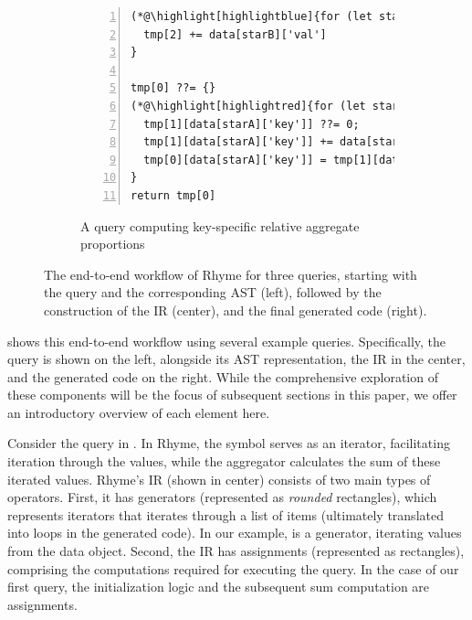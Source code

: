 \documentclass[runningheads]{llncs}
\newcommand{\lang}{Rhyme}
\begin{document}
\begin{figure}[t!]
\begin{subfigure}{\textwidth}
\begin{minipage}{0.38\textwidth}
\begin{lstlisting}[style=JavaScriptTiny, columns=flexible, numbers=left, xleftmargin=2pt]
(*@\highlight[highlightblue]{for (let starB in data)}@*) {  // loop hoisted!
  tmp[2] += data[starB]['val']
}

tmp[0] ??= {}
(*@\highlight[highlightred]{for (let starA in data)}@*) {
  tmp[1][data[starA]['key']] ??= 0;
  tmp[1][data[starA]['key']] += data[starA]['val']
  tmp[0][data[starA]['key']] = tmp[1][data[starA]['key']] / tmp[2] (*@\label{line:deps}@*)
}
return tmp[0]
\end{lstlisting}
\end{minipage}
\caption{A query computing key-specific 
relative aggregate proportions
}\label{fig:intro_q3}
\end{subfigure}
\caption{
The end-to-end workflow of \lang{} for three queries, starting with the query
and the corresponding AST (left),
followed by the construction of the IR (center), and the final generated code (right).
}\label{fig:intro}
\end{figure}

 shows this end-to-end workflow using several example queries.
Specifically, the query is shown on the left, alongside its AST representation,
the IR in the center, and the generated code on the right.
While the comprehensive exploration of these components will be the focus of
subsequent sections in this paper, we offer an introductory overview of each
element here.

Consider the query in .
In \lang{}, the \inline{*} symbol serves as an iterator, facilitating iteration through
the  values, while the aggregator  calculates the sum of
these iterated values.
\lang{}'s IR (shown in center) consists of two main types of operators.
First, it has generators (represented as \emph{rounded} rectangles), which represents iterators
that iterates through a list of items (ultimately translated into loops in
the generated code).
In our example,  is a generator, iterating values from the data object.
Second, the IR has assignments (represented as rectangles), comprising the
computations required for executing the query.
In the case of our first query, the initialization logic  and
the subsequent sum computation  are assignments.
\end{document}

